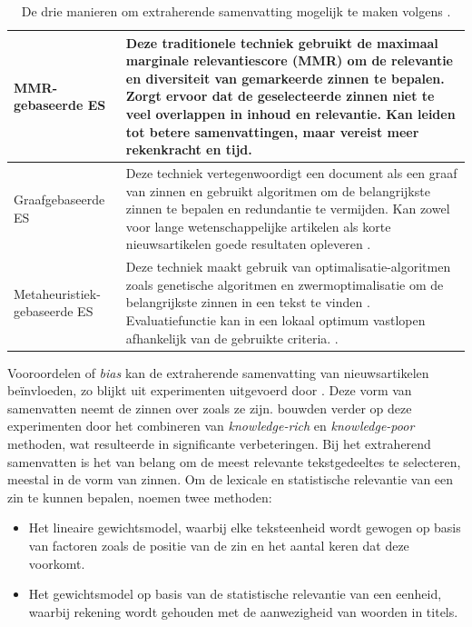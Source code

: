 \begin{center}
	\begin{table}[H]
	\begin{tabular}{ | m{4cm} | m{12cm} | } 
		\hline
		MMR-gebaseerde ES & Deze traditionele techniek gebruikt de maximaal marginale relevantiescore (MMR) om de relevantie en diversiteit van gemarkeerde zinnen te bepalen. Zorgt ervoor dat de geselecteerde zinnen niet te veel overlappen in inhoud en relevantie. Kan leiden tot betere samenvattingen, maar vereist meer rekenkracht en tijd. \\
		\hline
		Graafgebaseerde ES & Deze techniek vertegenwoordigt een document als een graaf van zinnen en gebruikt algoritmen om de belangrijkste zinnen te bepalen en redundantie te vermijden. Kan zowel voor lange wetenschappelijke artikelen als korte nieuwsartikelen goede resultaten opleveren \autocite{McDonald2007, Lin2010}. \\ 
		\hline
		Metaheuristiek-gebaseerde ES & Deze techniek maakt gebruik van optimalisatie-algoritmen zoals genetische algoritmen en zwermoptimalisatie om de belangrijkste zinnen in een tekst te vinden \autocite{Premjith2015, Verma2020}. Evaluatiefunctie kan in een lokaal optimum vastlopen afhankelijk van de gebruikte criteria. \autocite{Rani2021}. \\
		\hline
	\end{tabular}
	\caption{De drie manieren om extraherende samenvatting mogelijk te maken volgens \textcite{Verma2020}.}
	\label{table:extractive-summarization}
	\end{table}
\end{center}

\medspace

Vooroordelen of \textit{bias} kan de extraherende samenvatting van nieuwsartikelen beïnvloeden, zo blijkt uit experimenten uitgevoerd door \textcite{McKeown1999}. Deze vorm van samenvatten neemt de zinnen over zoals ze zijn. \textcite{Hahn2000} bouwden verder op deze experimenten door het combineren van \textit{knowledge-rich} en \textit{knowledge-poor} methoden, wat resulteerde in significante verbeteringen. Bij het extraherend samenvatten is het van belang om de meest relevante tekstgedeeltes te selecteren, meestal in de vorm van zinnen. Om de lexicale en statistische relevantie van een zin te kunnen bepalen, noemen \textcite{Hahn2000} twee methoden:

\begin{itemize}
	\item Het lineaire gewichtsmodel, waarbij elke teksteenheid wordt gewogen op basis van factoren zoals de positie van de zin en het aantal keren dat deze voorkomt.
	\item Het gewichtsmodel op basis van de statistische relevantie van een eenheid, waarbij rekening wordt gehouden met de aanwezigheid van woorden in titels.
\end{itemize}

